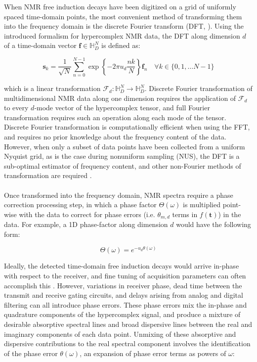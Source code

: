 \begin{doublespace}
When NMR free induction decays have been digitized on a grid of uniformly
spaced time-domain points, the most convenient method of transforming them
into the frequency domain is the discrete Fourier transform (DFT,
\cite{bretthorst:cmr2008,schuyler:jmr2013}). Using the introduced formalism for
hypercomplex NMR data, the DFT along dimension $d$ of a time-domain vector
$\mathbf{f} \in \mathbb{H}_D^N$ is defined as:

\begin{equation}
\mathbf{s}_k = \frac{1}{\sqrt{N}} \sum_{n=0}^{N-1}
  \exp\left\{ -2 \pi u_d \frac{n k}{N} \right\}
  \mathbf{f}_n
  \quad \forall k \in \{ 0, 1, \dots N-1 \}
\end{equation}

which is a linear transformation
$\mathcal{F}_d : \mathbb{H}_D^N \to \mathbb{H}_D^N$. Discrete Fourier
transformation of multidimensional NMR data along one dimension requires the
application of $\mathcal{F}_d$ to every $d$-mode vector of the hypercomplex
tensor, and full Fourier transformation requires such an operation along each
mode of the tensor. Discrete Fourier transformation is computationally
efficient when using the FFT, and requires no prior knowledge about the
frequency content of the data. However, when only a subset of data points
have been collected from a uniform Nyquist grid, as is the case during
nonuniform sampling (NUS), the DFT is a sub-optimal estimator of frequency
content, and other non-Fourier methods of transformation are required
\cite{bretthorst:cmr2008,mobli:pnmrs2014}.
\\\\
Once transformed into the frequency domain, NMR spectra require a phase
correction processing step, in which a phase factor $\Theta(\omega)$ is
multiplied point-wise with the data to correct for phase errors
(i.e. $\theta_{m,d}$ terms in $f(\mathbf{t})$) in the data. For example, a
1D phase-factor along dimension $d$ would have the following form:

\begin{equation}
\Theta(\omega) = e^{ -u_d \theta(\omega) }
\end{equation}

Ideally, the detected time-domain free induction decays would arrive in-phase
with respect to the receiver, and fine tuning of acquisition parameters can
often accomplish this \cite{chylla:jbnmr1998}.
However, variations in receiver phase, dead time
between the transmit and receive gating circuits, and delays arising from
analog and digital filtering can all introduce phase errors. These phase
errors mix the in-phase and quadrature components of the hypercomplex signal,
and produce a mixture of desirable absorptive spectral lines and broad
dispersive lines between the real and imaginary components of each data point.
Unmixing of these absorptive and dispersive contributions to the real spectral
component involves the identification of the phase error $\theta(\omega)$, an
expansion of phase error terms as powers of $\omega$:


\end{doublespace}
